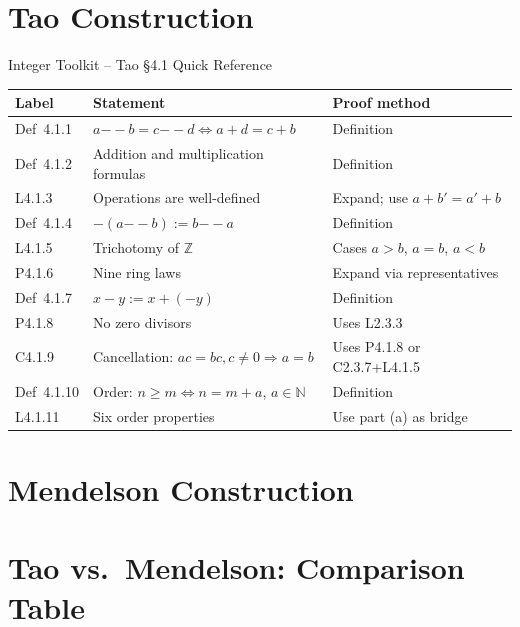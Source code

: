 


\section{Tao Construction}

\begin{toolkitbox}{Integer Toolkit -- Tao \S4.1 Quick Reference}
\small
\begin{tabular}{l l l}
\toprule
\textbf{Label} & \textbf{Statement} & \textbf{Proof method} \\
\midrule
Def~4.1.1   & $a{-\!\!-}b = c{-\!\!-}d \iff a+d=c+b$ & Definition \\
Def~4.1.2   & Addition and multiplication formulas & Definition \\
L4.1.3      & Operations are well-defined & Expand; use $a+b'=a'+b$ \\
Def~4.1.4   & $-(a{-\!\!-}b) := b{-\!\!-}a$ & Definition \\
L4.1.5      & Trichotomy of $\mathbb{Z}$ & Cases $a>b$, $a=b$, $a<b$ \\
P4.1.6      & Nine ring laws & Expand via representatives \\
Def~4.1.7   & $x - y := x + (-y)$ & Definition \\
P4.1.8      & No zero divisors & Uses L2.3.3 \\
C4.1.9      & Cancellation: $ac=bc, c\neq 0 \Rightarrow a=b$ & Uses P4.1.8 or C2.3.7+L4.1.5 \\
Def~4.1.10  & Order: $n \geq m \iff n = m+a$, $a \in \mathbb{N}$ & Definition \\
L4.1.11     & Six order properties & Use part (a) as bridge \\
\bottomrule
\end{tabular}
\end{toolkitbox}



\section{Mendelson Construction}


\section{Tao vs.\ Mendelson: Comparison Table}

